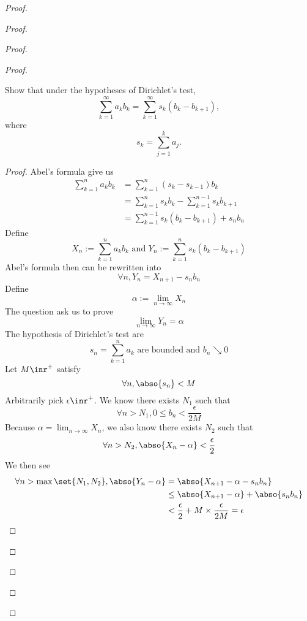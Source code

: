 \documentclass{report}
\begin{document}
\begin{proof}
\begin{proof}
\begin{proof}
\begin{proof}
\begin{question}{}{}
Show that under the hypotheses of Dirichlet’s test,
\[
\sum_{k=1}^{\infty} a_k b_k = \sum_{k=1}^{\infty} s_k (b_k - b_{k+1}),
\]
where 
\[
s_k = \sum_{j=1}^{k} a_j.
\]
\end{question}
\begin{proof}
Abel's formula give us
\begin{align*}
\sum_{k=1}^na_kb_k&=\sum_{k=1}^n (s_{k}-s_{k-1})b_k\\
&=\sum_{k=1}^n s_kb_k-\sum_{k=1}^{n-1} s_kb_{k+1}\\
&=\sum_{k=1}^{n-1}s_k(b_k-b_{k+1})+s_nb_n
\end{align*}
Define 
\begin{equation*}
X_n:=\sum_{k=1}^n a_kb_k\text{ and }Y_n:=\sum_{k=1}^{n}s_k(b_k-b_{k+1})
\end{equation*}
Abel's formula then can be rewritten into
\begin{equation*}
\forall n,Y_n=X_{n+1}-s_nb_n
\end{equation*}
Define
\begin{equation*}
\alpha :=\lim_{n\to\infty}X_n 
\end{equation*}
The question ask us to prove
\begin{equation*}
\lim_{n\to\infty}Y_n=\alpha 
\end{equation*}
The hypothesis of Dirichlet's test are 
\begin{equation*}
  s_n=\sum_{k=1}^n a_k\text{ are bounded and }b_n\searrow 0 
\end{equation*}
Let $M\inr^+$ satisfy
\begin{equation*}
\forall n, \abso{s_n}<M
\end{equation*}
Arbitrarily pick $\epsilon\inr^+$. We know there exists $N_1$ such that
 \begin{equation*}
\forall n>N_1, 0\leq b_n<\frac{\epsilon }{2M}
\end{equation*}
Because  $\alpha =\lim_{n\to\infty}X_n$, we also know there exists $N_2$ such that
 \begin{equation*}
\forall n>N_2, \abso{X_n-\alpha }<\frac{\epsilon }{2}
\end{equation*}
We then see 
\begin{align*}
  \forall n>\max \set{N_1,N_2}, \abso{Y_n-\alpha }&=\abso{X_{n+1}-\alpha -s_nb_n}\\
  &\leq \abso{X_{n+1}-\alpha }+\abso{s_nb_n}\\
  &<\frac{\epsilon}{2}+M\times \frac{\epsilon }{2M}=\epsilon 

\end{align*}
\end{proof}
\end{proof}
\end{proof}
\end{proof}
\end{proof}
\end{document}
